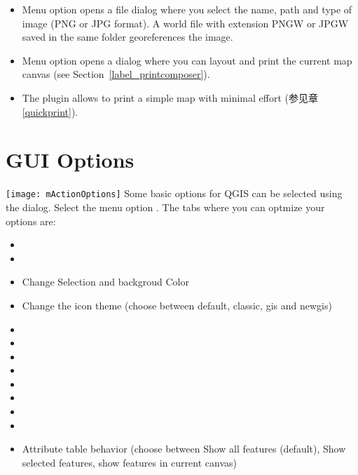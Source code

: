 \begin{itemize}
\item Menu option  opens
a file dialog where you select the name, path and type of image (PNG or JPG
format). A world file with extension PNGW or JPGW saved in the same folder
georeferences the image.
\item Menu option  opens a
dialog where you can layout and print the current map canvas (see
Section~\ref{label_printcomposer}).
\item The  plugin allows
to print a simple map with minimal effort (参见章 \ref{quickprint}).
\end{itemize}

\section{GUI Options}\label{subsec:gui_options}

\texttt{[image: mActionOptions]} Some basic options
for QGIS can be selected using the  dialog. Select the
menu option  \arrow
{}. The tabs where you can
optmize your options are:


\begin{itemize}
\item {}
\item {}
\item Change Selection and backgroud Color
\item Change the icon theme (choose between default, classic, gis and newgis)
\item {}
\item {}
\item {}
\item {}
\item {}
\item {}
\item {}
\item {}
\item Attribute table behavior (choose between Show all features (default), Show selected features,
show features in current canvas)
\end{itemize}

